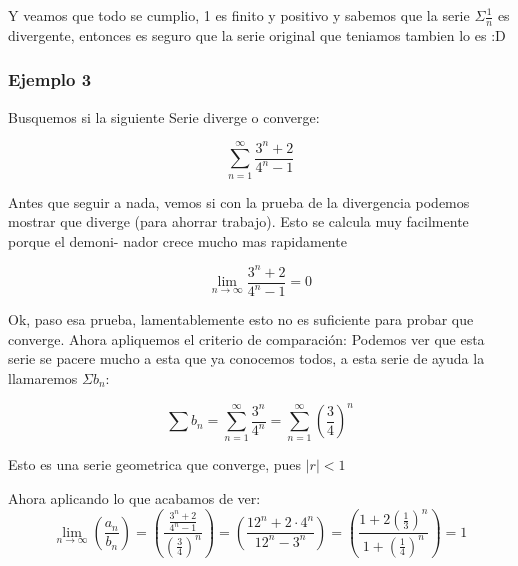 \documentclass[12pt]{report}                                %
\begin{document}
            Y veamos que todo se cumplio, 1 es finito y positivo y sabemos que la serie $\Sigma \frac{1}{n}$ es divergente, entonces es seguro que la serie original que teniamos tambien lo es :D


        \subsubsection{Ejemplo 3}
            Busquemos si la siguiente Serie diverge o converge:

            \begin{equation*}
                \sum_{n=1}^{\infty} \frac{3^n+2}{4^n-1}
            \end{equation*}

            Antes que seguir a nada, vemos si con la prueba de la divergencia podemos mostrar que diverge (para ahorrar trabajo). Esto se calcula muy facilmente porque el demoni- nador crece mucho mas rapidamente

            \begin{equation*}
                \lim_{n \to \infty}  \frac{3^n+2}{4^n-1} = 0
            \end{equation*}


            Ok, paso esa prueba, lamentablemente esto no es
            suficiente para probar que converge.
            Ahora apliquemos el criterio de comparación: Podemos ver que esta serie se pacere mucho a esta que ya conocemos todos, a esta serie de ayuda la llamaremos $\Sigma b_n$:

            \begin{equation*}
                \sum b_n = \sum_{n=1}^{\infty} \frac{3^n}{4^n} = \sum_{n=1}^{\infty} \left( \frac{3}{4} \right)^n 
            \end{equation*}

            Esto es una serie geometrica que converge, pues $|r| < 1$

            Ahora aplicando lo que acabamos de ver:
            \begin{equation*}
                \lim_{n \to \infty} \left( \frac{a_n}{b_n} \right) = \left( \frac{ \frac{3^n+2}{4^n-1} }{ \left( \frac{3}{4} \right)^n  } \right) =  \left( \frac{12^n + 2 \cdot 4^n}{12^n -3^n} \right) = \left( \frac{1 + 2 (\frac{1}{3})^n}{1 +  (\frac{1}{4})^n} \right) = 1
            \end{equation*}
\end{document}

